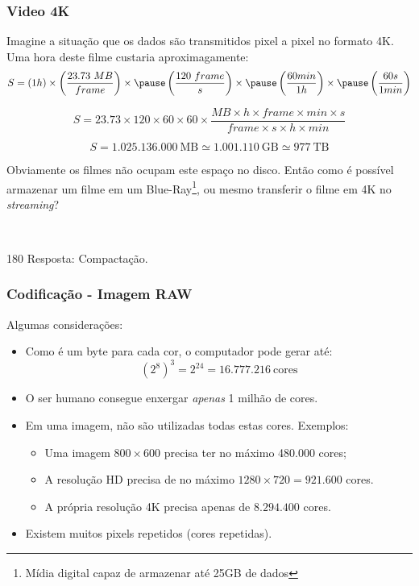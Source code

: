 \documentclass[10pt, handout]{beamer}
\begin{document}
\begin{frame}[t]
    \frametitle{Video 4K}

    Imagine a situação que os dados são transmitidos pixel a pixel no formato 4K. Uma hora deste filme custaria aproximagamente:
    \pause
    $$S = (1h)\times\left(\frac{23.73\ MB}{frame}\right) \times
        \pause\left(\frac{120\ frame}{s}\right)\times
        \pause\left(\frac{60 min}{1h}\right)\times
        \pause\left(\frac{60s}{1min}\right) $$

    \pause
    $$S = 23.73\times 120\times 60\times 60\times\frac{MB\times h\times frame\times min\times s}{frame\times s\times h\times min}$$

    \pause
    $$S = 1.025.136.000\ \text{MB} \simeq 1.001.110\ \text{GB}\simeq 977\ \text{TB}$$

    \pause
    Obviamente os filmes não ocupam este espaço no disco. Então como é possível armazenar um filme em um Blue-Ray\footnote{Mídia digital capaz de armazenar até 25GB de dados}, ou mesmo transferir o filme em 4K no \emph{streaming}?\vfill

    \pause
    \begin{flushbottom}
        \begin{minipage}{\textwidth}
            \ {\raggedleft
            \begin{turn}{180}
                \tiny Resposta: Compactação.
            \end{turn}
            \par}
        \end{minipage}
    \end{flushbottom}
\end{frame}

\begin{frame}[t]
    \frametitle{Codificação - Imagem RAW}
    Algumas considerações:\vfill
    \begin{itemize}
        \setlength\itemsep{2em}
        \item Como é um byte para cada cor, o computador pode gerar até:
              $$(2^8)^3 = 2^{24} = 16.777.216\ \text{cores}$$
        \item O ser humano consegue enxergar \emph{apenas} 1 milhão de cores.
        \item Em uma imagem, não são utilizadas todas estas cores. Exemplos:
              \begin{itemize}
                  \item Uma imagem $800\times 600$ precisa ter no máximo 480.000 cores;
                  \item A resolução HD precisa de no máximo $1280\times 720 = 921.600$ cores.
                  \item A própria resolução 4K precisa apenas de $8.294.400$ cores.
              \end{itemize}
        \item Existem muitos pixels repetidos (cores repetidas).
    \end{itemize}
\end{frame}
\end{document}

